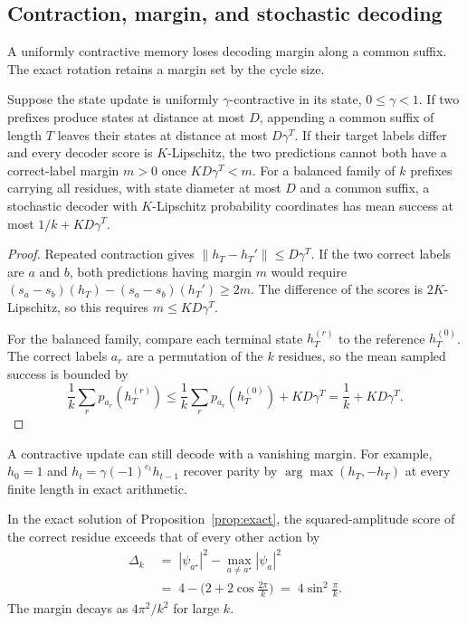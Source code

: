 \subsection{Contraction, margin, and stochastic decoding}
\label{app:contractive}
A uniformly contractive memory loses decoding margin along a common
suffix. The exact rotation retains a margin set by the cycle size.

\begin{proposition}
\label{prop:contractive}
Suppose the state update is uniformly $\gamma$-contractive in its state, $0\le\gamma<1$.
If two prefixes produce states at distance at most $D$, appending a common suffix of
length $T$ leaves their states at distance at most $D\gamma^T$. If their target labels
differ and every decoder score is $K$-Lipschitz, the two predictions cannot both have a
correct-label margin $m>0$ once $KD\gamma^T<m$. For a balanced family of $k$ prefixes
carrying all residues, with state diameter at most $D$ and a common suffix, a stochastic
decoder with $K$-Lipschitz probability coordinates has mean success at most
$1/k+KD\gamma^T$.
\end{proposition}

\begin{proof}
Repeated contraction gives $\|h_T-h_T'\|\leq D\gamma^T$. If the two
correct labels are $a$ and $b$, both predictions having margin $m$ would
require $(s_a-s_b)(h_T)-(s_a-s_b)(h_T')\geq2m$. The difference of the
scores is $2K$-Lipschitz, so this requires $m\leq KD\gamma^T$.

For the balanced family, compare each terminal state $h_T^{(r)}$ to the
reference $h_T^{(0)}$. The correct labels $a_r$ are a permutation of the
$k$ residues, so the mean sampled success is bounded by
\[
\frac{1}{k}\sum_r p_{a_r}(h_T^{(r)})
\leq \frac{1}{k}\sum_r p_{a_r}(h_T^{(0)})+KD\gamma^T
= \frac{1}{k}+KD\gamma^T.
\]
\end{proof}
A contractive update can still decode with a vanishing margin. For example,
$h_0=1$ and $h_t=\gamma(-1)^{e_t}h_{t-1}$ recover parity by
$\arg\max(h_T,-h_T)$ at every finite length in exact arithmetic.

\begin{lemma}
\label{lem:margin}
In the exact solution of Proposition~\ref{prop:exact}, the squared-amplitude
score of the correct residue exceeds that of every other action by
\begin{equation}
\begin{aligned}
\Delta_k &\;=\; |\psi_{a^\star}|^2 - \max_{a\neq a^\star}|\psi_a|^2\\
&\;=\; 4 - \Big(2+2\cos\tfrac{2\pi}{k}\Big) \;=\; 4\sin^2\!\tfrac{\pi}{k}.
\end{aligned}
\label{eq:margin}
\end{equation}
The margin decays as $4\pi^2/k^2$ for large $k$.
\end{lemma}


